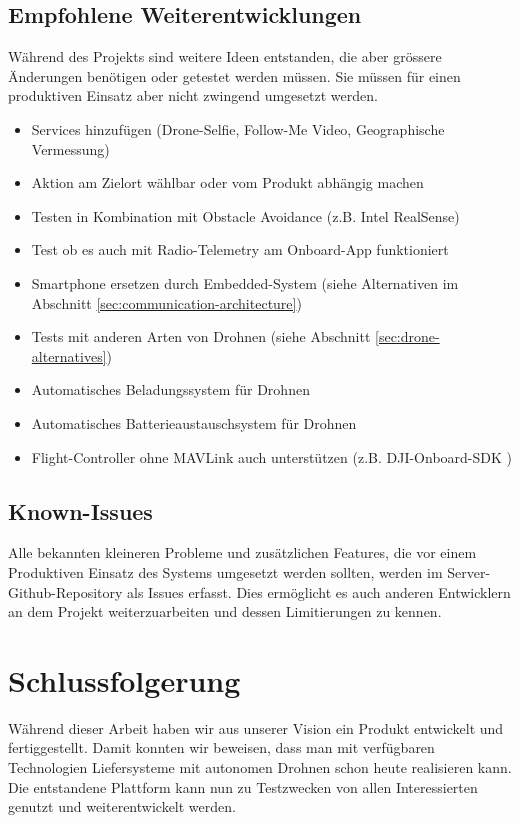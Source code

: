 \subsection{Empfohlene Weiterentwicklungen}

Während des Projekts sind weitere Ideen entstanden, die aber grössere Änderungen benötigen oder getestet werden müssen. Sie müssen für einen produktiven Einsatz aber nicht zwingend umgesetzt werden.

\begin{itemize}
	\item Services hinzufügen (Drone-Selfie, Follow-Me Video, Geographische Vermessung)
	\item Aktion am Zielort wählbar oder vom Produkt abhängig machen
	\item Testen in Kombination mit Obstacle Avoidance (z.B. Intel RealSense\cite{realsense})
	\item Test ob es auch mit Radio-Telemetry am Onboard-App funktioniert
	\item Smartphone ersetzen durch Embedded-System (siehe Alternativen im Abschnitt \ref{sec:communication-architecture}) 
	\item Tests mit anderen Arten von Drohnen (siehe Abschnitt \ref{sec:drone-alternatives})
	\item Automatisches Beladungssystem für Drohnen
	\item Automatisches Batterieaustauschsystem für Drohnen
	\item Flight-Controller ohne MAVLink auch unterstützen (z.B. DJI-Onboard-SDK \cite{dji-sdk})
\end{itemize} 


\subsection{Known-Issues}

Alle bekannten kleineren Probleme und zusätzlichen Features, die vor einem Produktiven Einsatz des Systems umgesetzt werden sollten, werden im Server-Github-Repository als Issues erfasst. Dies ermöglicht es auch anderen Entwicklern an dem Projekt weiterzuarbeiten und dessen Limitierungen zu kennen.


\section{Schlussfolgerung}

Während dieser Arbeit haben wir aus unserer Vision ein Produkt entwickelt und fertiggestellt. Damit konnten wir beweisen, dass man mit verfügbaren Technologien Liefersysteme mit autonomen Drohnen schon heute realisieren kann. Die entstandene Plattform kann nun zu Testzwecken von allen Interessierten genutzt und weiterentwickelt werden.\\

